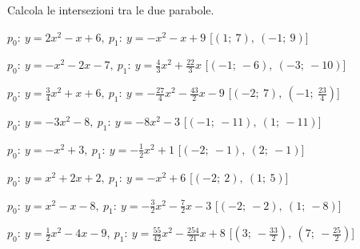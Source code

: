 \begin{esercizio}\label{ese:}
 Calcola le intersezioni tra le due parabole.
 \begin{enumeratea}
  \item  $p_0:~y=2 x^2 - x +6,~p_1:~y=- x^2 - x +9$
   \hfill [$\left (1;~7 \right ),~\left (-1;~9 \right )$]
  \item  $p_0:~y=- x^2 -2 x -7,~p_1:~y=\frac{4}{3} x^2 +\frac{22}{3} x $
   \hfill [$\left (-1;~-6 \right ),~\left (-3;~-10 \right )$]
  \item  $p_0:~y=\frac{3}{4} x^2 + x +6,~p_1:~y=-\frac{27}{4} x^2 -\frac{43}{2} x -9$
   \hfill [$\left (-2;~7 \right ),~\left (-1;~\frac{23}{4} \right )$]
  \item  $p_0:~y=-3 x^2 -8,~p_1:~y=-8 x^2 -3$
   \hfill [$\left (-1;~-11 \right ),~\left (1;~-11 \right )$]
  \item  $p_0:~y=- x^2 +3,~p_1:~y=-\frac{1}{2} x^2 +1$
   \hfill [$\left (-2;~-1 \right ),~\left (2;~-1 \right )$]
  \item  $p_0:~y=x^2 +2 x +2,~p_1:~y=- x^2 +6$
   \hfill [$\left (-2;~2 \right ),~\left (1;~5 \right )$]
  \item  $p_0:~y=x^2 - x -8,~p_1:~y=-\frac{3}{2} x^2 -\frac{7}{2} x -3$
   \hfill [$\left (-2;~-2 \right ),~\left (1;~-8 \right )$]
  \item  $p_0:~y=\frac{1}{2} x^2 -4 x -9,~p_1:~y=\frac{55}{42} x^2 -\frac{254}{21} x +8$
   \hfill [$\left (3;~-\frac{33}{2} \right ),~\left (7;~-\frac{25}{2} \right )$]

\end{enumeratea}
\end{esercizio}
